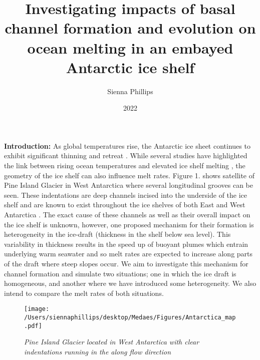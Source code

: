 \documentclass[10pt]{article}{\twocolumn}
\title{Investigating impacts of basal channel formation and evolution on ocean melting in an embayed Antarctic ice shelf}
\author{Sienna Phillips}
\date{2022}
\begin{document}
\maketitle

\indent
\textbf{Introduction:}
As global temperatures rise, the Antarctic ice sheet continues to exhibit significant thinning and retreat \cite{RN9}. While several studies have highlighted the link between rising ocean temperatures and elevated ice shelf melting \cite{RN34,RN35,RN36,RN37}, the geometry of the ice shelf can also influence melt rates. Figure 1. shows satellite of Pine Island Glacier in West Antarctica where several longitudinal grooves can be seen. These indentations are deep channels incised into the underside of the ice shelf and are known to exist throughout the ice shelves of both East and West Antarctica \cite{RN14}. The exact cause of these channels as well as their overall impact on the ice shelf is unknown, however, one proposed mechanism for their formation is heterogeneity in the ice-draft (thickness in the shelf below sea level). This variability in thickness results in the speed up of buoyant plumes which entrain underlying warm seawater and so melt rates are expected to increase along parts of the draft where steep slopes occur. 
\newline
\indent
We aim to investigate this mechanism for channel formation and simulate two situations; one in which the ice draft is homogeneous, and another where we have introduced some heterogeneity. We also intend to compare the melt rates of both situations.
\begin{figure}[htbp]
\texttt{[image: /Users/siennaphillips/desktop/Medaes/Figures/Antarctica\_map.pdf]}
\caption{\textit{Pine Island Glacier located in West Antarctica with clear indentations running in the along flow direction}}
\label{default}
\end{figure}
\end{document}

